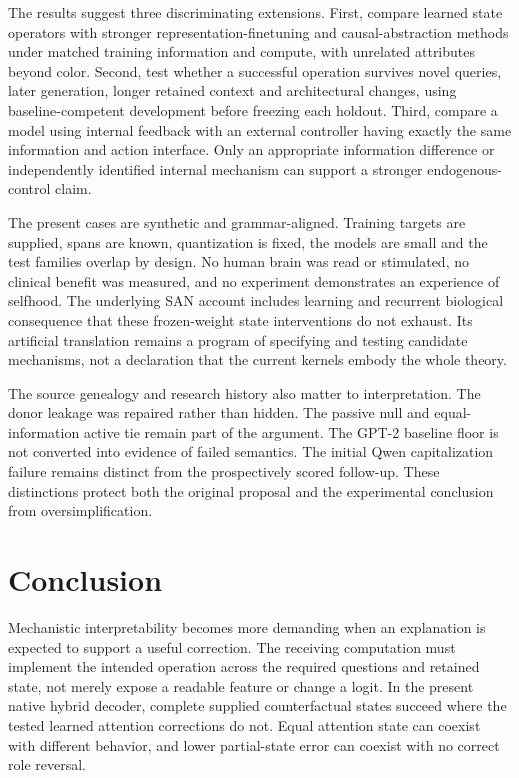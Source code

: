 \documentclass[11pt,letterpaper]{article}
\begin{document}
The results suggest three discriminating extensions. First, compare learned state operators with stronger representation-finetuning and causal-abstraction methods under matched training information and compute, with unrelated attributes beyond color. Second, test whether a successful operation survives novel queries, later generation, longer retained context and architectural changes, using baseline-competent development before freezing each holdout. Third, compare a model using internal feedback with an external controller having exactly the same information and action interface. Only an appropriate information difference or independently identified internal mechanism can support a stronger endogenous-control claim.

The present cases are synthetic and grammar-aligned. Training targets are supplied, spans are known, quantization is fixed, the models are small and the test families overlap by design. No human brain was read or stimulated, no clinical benefit was measured, and no experiment demonstrates an experience of selfhood. The underlying SAN account includes learning and recurrent biological consequence that these frozen-weight state interventions do not exhaust. Its artificial translation remains a program of specifying and testing candidate mechanisms, not a declaration that the current kernels embody the whole theory.

The source genealogy and research history also matter to interpretation. The donor leakage was repaired rather than hidden. The passive null and equal-information active tie remain part of the argument. The GPT-2 baseline floor is not converted into evidence of failed semantics. The initial Qwen capitalization failure remains distinct from the prospectively scored follow-up. These distinctions protect both the original proposal and the experimental conclusion from oversimplification.

\section{Conclusion}

Mechanistic interpretability becomes more demanding when an explanation is expected to support a useful correction. The receiving computation must implement the intended operation across the required questions and retained state, not merely expose a readable feature or change a logit. In the present native hybrid decoder, complete supplied counterfactual states succeed where the tested learned attention corrections do not. Equal attention state can coexist with different behavior, and lower partial-state error can coexist with no correct role reversal.
\end{document}
